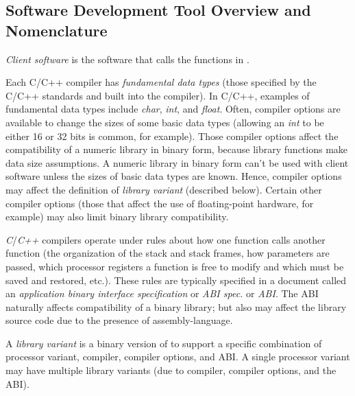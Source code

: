\subsection{Software Development Tool Overview and Nomenclature}
\label{cldd0:snom0:ssdt0}

\emph{Client software} is the 
software that calls the functions in 
\emph{\productbasenameshort{}}.  

Each C/C++ compiler has \emph{fundamental data types} (those specified by the C/C++
standards and built into the compiler).
In C/C++, examples of fundamental data 
types include \emph{char}, \emph{int}, and \emph{float}.  
Often, compiler options are available to change the sizes of 
some basic data types (allowing an \emph{int} to be either 
16 or 32 bits is common, for example).  Those compiler 
options affect the compatibility of a numeric library in 
binary form, because library functions make data size 
assumptions.  A numeric library in binary form can't be used 
with client software unless the sizes of basic data types 
are known.  Hence, compiler options may affect the 
definition of \emph{library variant} (described below).  
Certain other compiler options (those that affect the use of 
floating-point hardware, for example) may also limit binary 
library compatibility.  

\emph{C}/\emph{C++} compilers operate under rules about how 
one function calls another function (the organization of the 
stack and stack frames, how parameters are passed, which 
processor registers a function is free to modify and which 
must be saved and restored, etc.).  These rules are 
typically specified in a document called an 
\emph{application binary 
interface specification} or \emph{ABI spec.} or 
\emph{ABI}\@.  The ABI naturally affects compatibility of a 
binary library; but also may affect the library source code 
due to the presence of assembly-language.  

A \emph{library variant} is a binary 
version of \emph{\productbasenameshort{}} to support a 
specific combination of processor variant, compiler, 
compiler options, and ABI\@.  A single processor variant may 
have multiple library variants (due to compiler, compiler 
options, and the ABI).  

